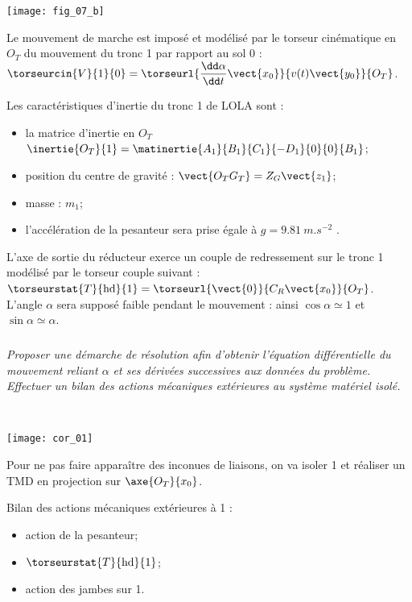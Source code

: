 \begin{multicols}{2}
\begin{center}
\texttt{[image: fig\_07\_b]}
\end{center}

Le mouvement de marche est imposé et modélisé par le torseur cinématique en $O_T$ du mouvement du tronc 1
par rapport au sol 0 : $\torseurcin{V}{1}{0}=\torseurl{\dfrac{\dd \alpha}{\dd t}\vect{x_0}}{v(t)\vect{y_0}}{O_T}$.

Les caractéristiques d'inertie du tronc 1 de LOLA sont :
\begin{itemize}
\item la matrice d'inertie en $O_T$ $\inertie{O_T}{1} = \matinertie{A_1}{B_1}{C_1}{-D_1}{0}{0}{B_1}$;
\item position du centre de gravité : $\vect{O_TG_T}=Z_G\vect{z_1}$;
\item masse : $m_1$;
\item l'accélération de la pesanteur sera prise égale à $g=\SI{9,81}{m.s^{-2}}$ .
\end{itemize}


L'axe de sortie du réducteur exerce un couple de redressement sur le tronc 1 modélisé par le torseur couple
suivant : $\torseurstat{T}{\text{hd}}{1}=\torseurl{\vect{0}}{C_R\vect{x_0}}{O_T}$. L'angle $\alpha$ sera supposé faible pendant le mouvement : ainsi $\cos \alpha \simeq 1$ et $\sin \alpha \simeq \alpha$.


\subparagraph{} \textit{Proposer une démarche de résolution afin d'obtenir l'équation différentielle du mouvement reliant $\alpha$ et
ses dérivées successives aux données du problème. Effectuer un bilan des actions mécaniques
extérieures au système matériel isolé.}
\ifprof
\begin{corrige} ~\\

\begin{center}
\texttt{[image: cor\_01]}
\end{center}

Pour ne pas faire apparaître des inconues de liaisons, on va isoler 1 et réaliser un TMD en projection sur $\axe{O_T}{x_0}$.

Bilan des actions mécaniques extérieures à 1 : 
\begin{itemize}
\item action de la pesanteur;
\item $\torseurstat{T}{\text{hd}}{1}$;
\item action des jambes sur 1. 
\end{itemize}
\end{corrige}
\else
\fi



\end{multicols}
